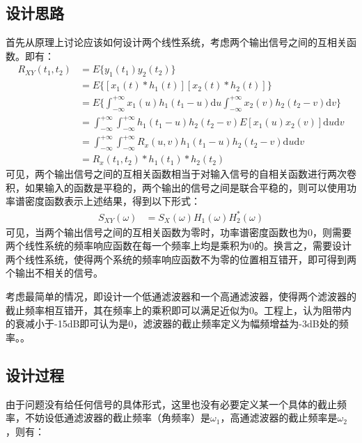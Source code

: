 \documentclass[11pt]{article}
\begin{document}
\subsection{设计思路}
首先从原理上讨论应该如何设计两个线性系统，考虑两个输出信号之间的互相关函数。即有：
\begin{equation}
  \begin{aligned}
    R_{XY}(t_1,t_2) & =E\{y_1(t_1)y_2(t_2)\}                                                                                               \\
                    & =E\{[x_1(t)*h_1(t)][x_2(t)*h_2(t)]\}                                                                                 \\
                    & =E\Big\{\int_{-\infty}^{+\infty}x_1(u)h_1(t_1-u)\mathrm{d}u\int_{-\infty}^{+\infty}x_2(v)h_2(t_2-v)\mathrm{d}v\Big\} \\
                    & =\int_{-\infty}^{+\infty}\int_{-\infty}^{+\infty}h_1(t_1-u)h_2(t_2-v)E[x_1(u)x_2(v)]\mathrm{d}u\mathrm{d}v           \\
                    & =\int_{-\infty}^{+\infty}\int_{-\infty}^{+\infty}R_x(u,v)h_1(t_1-u)h_2(t_2-v)\mathrm{d}u\mathrm{d}v                  \\
                    & =R_x(t_1,t_2)*h_1(t_1)*h_2(t_2)
  \end{aligned}
\end{equation}
可见，两个输出信号之间的互相关函数相当于对输入信号的自相关函数进行两次卷积，如果输入的函数是平稳的，两个输出的信号之间是联合平稳的，则可以使用功率谱密度函数表示上述结果，得到以下形式：
\begin{equation}
  \begin{aligned}
    S_{XY}(\omega) & =S_X(\omega)H_1(\omega)H_2^*(\omega)
  \end{aligned}
\end{equation}
可见，当两个输出信号之间的互相关函数为零时，功率谱密度函数也为0，则需要两个线性系统的频率响应函数在每一个频率上均是乘积为0的。换言之，需要设计两个线性系统，使得两个系统的频率响应函数不为零的位置相互错开，即可得到两个输出不相关的信号。

考虑最简单的情况，即设计一个低通滤波器和一个高通滤波器，使得两个滤波器的截止频率相互错开，其在频率上的乘积即可以满足近似为0。工程上，认为阻带内的衰减小于-15dB即可认为是0，滤波器的截止频率定义为幅频增益为-3dB处的频率。\cite*{signal_system}。
\subsection{设计过程}
由于问题没有给任何信号的具体形式，这里也没有必要定义某一个具体的截止频率，不妨设低通滤波器的截止频率（角频率）是$\omega_1$，高通滤波器的截止频率是$\omega_2$，则有：
\end{document}

